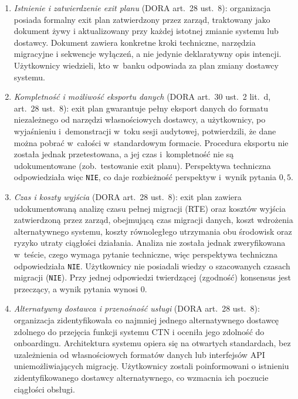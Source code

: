 \begin{enumerate}[label=(\roman*)]
  \item \textit{Istnienie i zatwierdzenie exit planu} (DORA art.~28 ust.~8): organizacja posiada formalny exit plan zatwierdzony przez zarząd, traktowany jako dokument żywy i aktualizowany przy każdej istotnej zmianie systemu lub dostawcy. Dokument zawiera konkretne kroki techniczne, narzędzia migracyjne i sekwencje wyłączeń, a nie jedynie deklaratywny opis intencji. Użytkownicy wiedzieli, kto w~banku odpowiada za plan zmiany dostawcy systemu.

  \item \textit{Kompletność i możliwość eksportu danych} (DORA art.~30 ust.~2 lit.~d, art.~28 ust.~8): exit plan gwarantuje pełny eksport danych do formatu niezależnego od narzędzi własnościowych dostawcy, a użytkownicy, po wyjaśnieniu i~demonstracji w~toku sesji audytowej, potwierdzili, że dane można pobrać w~całości w~standardowym formacie. Procedura eksportu nie została jednak przetestowana, a jej czas i~kompletność nie są udokumentowane (zob.\ testowanie exit planu). Perspektywa techniczna odpowiedziała więc \texttt{NIE}, co daje rozbieżność perspektyw i~wynik pytania $0{,}5$.

  \item \textit{Czas i koszty wyjścia} (DORA art.~28 ust.~8): exit plan zawiera udokumentowaną analizę czasu pełnej migracji (RTE) oraz kosztów wyjścia zatwierdzoną przez zarząd, obejmującą czas migracji danych, koszt wdrożenia alternatywnego systemu, koszty równoległego utrzymania obu środowisk oraz ryzyko utraty ciągłości działania. Analiza nie została jednak zweryfikowana w~teście, czego wymaga pytanie techniczne, więc perspektywa techniczna odpowiedziała \texttt{NIE}. Użytkownicy nie posiadali wiedzy o szacowanych czasach migracji (\texttt{NIE}). Przy jednej odpowiedzi twierdzącej (zgodność) konsensus jest przeczący, a wynik pytania wynosi $0$.

  \item \textit{Alternatywny dostawca i przenośność usługi} (DORA art.~28 ust.~8): organizacja zidentyfikowała co najmniej jednego alternatywnego dostawcę zdolnego do przejęcia funkcji systemu CTN i oceniła jego zdolność do onboardingu. Architektura systemu opiera się na otwartych standardach, bez uzależnienia od własnościowych formatów danych lub interfejsów API uniemożliwiających migrację. Użytkownicy zostali poinformowani o istnieniu zidentyfikowanego dostawcy alternatywnego, co wzmacnia ich poczucie ciągłości obsługi.


\end{enumerate}
